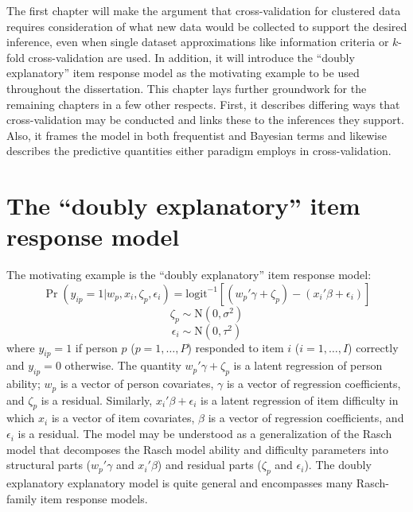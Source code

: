 The first chapter will make the argument that cross-validation for clustered data requires consideration of what new data would be collected to support the desired inference, even when single dataset approximations like information criteria or $k$-fold cross-validation are used. 
In addition, it will introduce the ``doubly explanatory'' item response model as the motivating example to be used throughout the dissertation.
This chapter lays further groundwork for the remaining chapters in a few other respects. First, it describes differing ways that cross-validation may be conducted and links these to
the inferences they support. Also, it frames the model in both frequentist and Bayesian terms and likewise describes the predictive quantities either paradigm employs in cross-validation.


\section{The ``doubly explanatory'' item response model}

The motivating example is the ``doubly explanatory'' \parencite{Wilson2004} item response model:
\begin{equation} \label{eq:eirm}
\Pr(y_{ip} = 1 | w_p, x_i, \zeta_p, \epsilon_i) =
\mathrm{logit}^{-1} \left [ (w_p'\gamma + \zeta_p) -
(x_i'\beta + \epsilon_i) \right ]
\end{equation}
\begin{equation}
\zeta_p \sim \mathrm{N}(0, \sigma^2)
\end{equation}
\begin{equation}
\epsilon_i \sim \mathrm{N}(0, \tau^2)
\end{equation}
where $y_{ip} = 1$ if person $p$ ($p = 1, \dotsc, P$) responded to item $i$ ($i = 1, \dotsc, I$) correctly and $y_{ip} = 0$ otherwise. The quantity $w_p'\gamma + \zeta_p$ is a latent regression of person ability; $w_p$ is a vector of person covariates, $\gamma$ is a vector of regression coefficients, and $\zeta_p$ is a residual. Similarly, $x_i'\beta + \epsilon_i$ is a latent regression of item difficulty in which $x_i$ is a vector of item covariates, $\beta$ is a vector of regression coefficients, and $\epsilon_i$ is a residual. The model may be understood as a generalization of the Rasch model \parencite{Rasch1960a} that decomposes the Rasch model ability and difficulty parameters into structural parts ($w_p'\gamma$ and $x_i'\beta$) and residual parts ($\zeta_p$ and $\epsilon_i$). The doubly explanatory explanatory model is quite general and encompasses many Rasch-family item response models.

